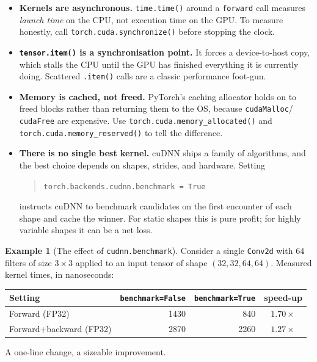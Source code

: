 \documentclass[11pt,a4paper]{article}
\theoremstyle{definition}
\newtheorem{example}[definition]{Example}
\theoremstyle{remark}
\theoremstyle{plain}
\begin{document}
\begin{itemize}[leftmargin=1.5em, itemsep=3pt]
    \item \textbf{Kernels are asynchronous.} \texttt{time.time()}
          around a \texttt{forward} call measures \emph{launch time}
          on the CPU, not execution time on the GPU. To measure
          honestly, call \texttt{torch.cuda.synchronize()} before
          stopping the clock.
    \item \textbf{\texttt{tensor.item()} is a synchronisation
          point.} It forces a device-to-host copy, which stalls the
          CPU until the GPU has finished everything it is currently
          doing. Scattered \texttt{.item()} calls are a classic
          performance foot-gun.
    \item \textbf{Memory is cached, not freed.} PyTorch's caching
          allocator holds on to freed blocks rather than returning
          them to the OS, because \texttt{cudaMalloc}\slash
          \texttt{cudaFree} are expensive. Use
          \texttt{torch.cuda.memory\_allocated()} and
          \texttt{torch.cuda.memory\_reserved()} to tell the
          difference.
    \item \textbf{There is no single best kernel.}
          cuDNN ships a family of algorithms, and the best choice
          depends on shapes, strides, and hardware. Setting
\begin{quote}\small
          \texttt{torch.backends.cudnn.benchmark = True}
\end{quote}
          instructs cuDNN to benchmark candidates on the first
          encounter of each shape and cache the winner. For static
          shapes this is pure profit; for highly variable shapes it
          can be a net loss.
\end{itemize}

\begin{example}[The effect of \texttt{cudnn.benchmark}]
Consider a single \texttt{Conv2d} with $64$ filters of size
$3 \times 3$ applied to an input tensor of shape
$(32, 32, 64, 64)$. Measured kernel times, in nanoseconds:
\begin{center}
\renewcommand{\arraystretch}{1.2}
\begin{tabular}{@{}lrrc@{}}
\toprule
Setting & \texttt{benchmark=False} & \texttt{benchmark=True} & speed-up\\
\midrule
Forward (FP32)            & 1430 & 840  & $1.70\times$ \\
Forward+backward (FP32)   & 2870 & 2260 & $1.27\times$ \\
\bottomrule
\end{tabular}
\end{center}
A one-line change, a sizeable improvement.
\end{example}
\end{document}
